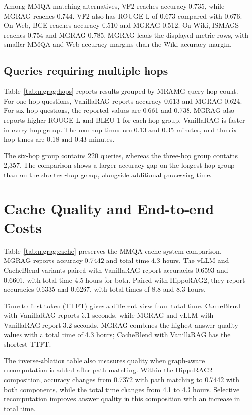 Among MMQA matching alternatives, VF2 reaches accuracy 0.735, while MGRAG reaches 0.744. VF2 also has ROUGE-L of 0.673 compared with 0.676. On Web, BGE reaches accuracy 0.510 and MGRAG 0.512. On Wiki, ISMAGS reaches 0.754 and MGRAG 0.785. MGRAG leads the displayed metric rows, with smaller MMQA and Web accuracy margins than the Wiki accuracy margin.

\subsection{Queries requiring multiple hops}

Table~\ref{tab:mgrag:hops} reports results grouped by MRAMG query-hop count. For one-hop questions, VanillaRAG reports accuracy 0.613 and MGRAG 0.624. For six-hop questions, the reported values are 0.661 and 0.738. MGRAG also reports higher ROUGE-L and BLEU-1 for each hop group. VanillaRAG is faster in every hop group. The one-hop times are 0.13 and 0.35 minutes, and the six-hop times are 0.18 and 0.43 minutes.



The six-hop group contains 220 queries, whereas the three-hop group contains 2,357. The comparison shows a larger accuracy gap on the longest-hop group than on the shortest-hop group, alongside additional processing time.

\section{Cache Quality and End-to-end Costs}
\label{sec:mgrag:cost-results}

Table~\ref{tab:mgrag:cache} preserves the MMQA cache-system comparison. MGRAG reports accuracy 0.7442 and total time 4.3 hours. The vLLM and CacheBlend variants paired with VanillaRAG report accuracies 0.6593 and 0.6601, with total time 4.5 hours for both. Paired with HippoRAG2, they report accuracies 0.6335 and 0.6267, with total times of 8.8 and 8.3 hours.



Time to first token (TTFT) gives a different view from total time. CacheBlend with VanillaRAG reports 3.1 seconds, while MGRAG and vLLM with VanillaRAG report 3.2 seconds. MGRAG combines the highest answer-quality values with a total time of 4.3 hours; CacheBlend with VanillaRAG has the shortest TTFT.

The inverse-ablation table also measures quality when graph-aware recomputation is added after path matching. Within the HippoRAG2 composition, accuracy changes from 0.7372 with path matching to 0.7442 with both components, while the total time changes from 4.1 to 4.3 hours. Selective recomputation improves answer quality in this composition with an increase in total time.

